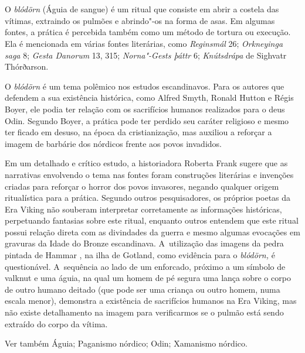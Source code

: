 \section{  }

O \emph{blódörn} (Águia de sangue) é um ritual que consiste em abrir a
costela das vítimas, extraindo os pulmões e abrindo"-os na forma de asas.
Em algumas fontes, a prática é percebida também como um método de
tortura ou execução. Ela é mencionada em várias fontes literárias, como
\emph{Reginsmál} 26; \emph{Orkneyinga saga} 8; \emph{Gesta Danorum} 13,
315; \emph{Norna"-Gests þáttr} 6; \emph{Knútsdrápa} de Sighvatr
Thórðarson.

O \emph{blódörn} é um tema polêmico nos estudos escandinavos. Para os
autores que defendem a sua existência histórica, como Alfred Smyth,
Ronald Hutton e Régis Boyer, ele podia ter relação com os sacrifícios
humanos realizados para o deus Odin. Segundo Boyer, a prática pode ter
perdido seu caráter religioso e mesmo ter ficado em desuso, na época da
cristianização, mas auxiliou a reforçar a imagem de barbárie dos
nórdicos frente aos povos invadidos.

Em um detalhado e crítico estudo, a historiadora Roberta Frank sugere
que as narrativas envolvendo o tema nas fontes foram construções
literárias e invenções criadas para reforçar o horror dos povos
invasores, negando qualquer origem ritualística para a prática. Segundo
outros pesquisadores, os próprios poetas da Era Viking não souberam
interpretar corretamente as informações históricas, perpetuando
fantasias sobre este ritual, enquanto outros entendem que este ritual
possui relação direta com as divindades da guerra e mesmo algumas
evocações em gravuras da Idade do Bronze escandinava. A~utilização das
imagens da pedra pintada de Hammar , na ilha de Gotland, como evidência
para o \emph{blódörn,} é questionável. A~sequência ao lado de um
enforcado, próximo a um símbolo de valknut e uma águia, na qual um homem
de pé segura uma lança sobre o corpo de outro humano deitado (que pode
ser uma criança ou outro homem, numa escala menor), demonstra a
existência de sacrifícios humanos na Era Viking, mas não existe
detalhamento na imagem para verificarmos se o pulmão está sendo extraído
do corpo da vítima.

Ver também Águia; Paganismo nórdico; Odin; Xamanismo nórdico.




